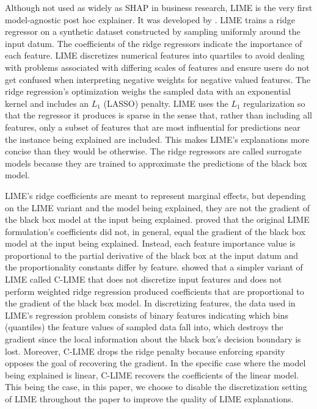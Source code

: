 \documentclass[mnsc,blindrev]{informs3}
\begin{document}
    
Although not used as widely as SHAP in business research, LIME is the very first model-agnostic post hoc explainer. It was developed by \citet{ribeiro16lime}. LIME trains a ridge regressor on a synthetic dataset constructed by sampling uniformly around the input datum. The coefficients of the ridge regressors indicate the importance of each feature. LIME discretizes numerical features into quartiles to avoid dealing with problems associated with differing scales of features and ensure users do not get confused when interpreting negative weights for negative valued features. The ridge regression's optimization weighs the sampled data with an exponential kernel and includes an $L_1$ (LASSO) penalty. LIME uses the $L_1$ regularization so that the regressor it produces is sparse in the sense that, rather than including all features, only a subset of features that are most influential for predictions near the instance being explained are included. This makes LIME's explanations more concise than they would be otherwise. The ridge regressors are called surrogate models because they are trained to approximate the predictions of the black box model.
    
    LIME's ridge coefficients are meant to represent marginal effects, but depending on the LIME variant and the model being explained, they are not the gradient of the black box model at the input being explained. \citet{garreau2020looking} proved that the original LIME formulation's coefficients did not, in general, equal the gradient of the black box model at the input being explained. Instead, each feature importance value is proportional to the partial derivative of the black box at the input datum and the proportionality constants differ by feature. \citet{agarwal21clime} showed that a simpler variant of LIME called C-LIME that does not discretize input features and does not perform weighted ridge regression produced coefficients that are proportional to the gradient of the black box model. %
    In discretizing features, the data used in LIME's regression problem consists of binary features indicating which bins (quantiles) the feature values of sampled data fall into, which destroys the gradient since the local information about the black box's decision boundary is lost. Moreover, C-LIME drops the ridge penalty because enforcing sparsity opposes the goal of recovering the gradient. In the specific case where the model being explained is linear, C-LIME recovers the coefficients of the linear model. This being the case, in this paper, we choose to disable the discretization setting of LIME throughout the paper to improve the quality of LIME explanations.
\end{document}

